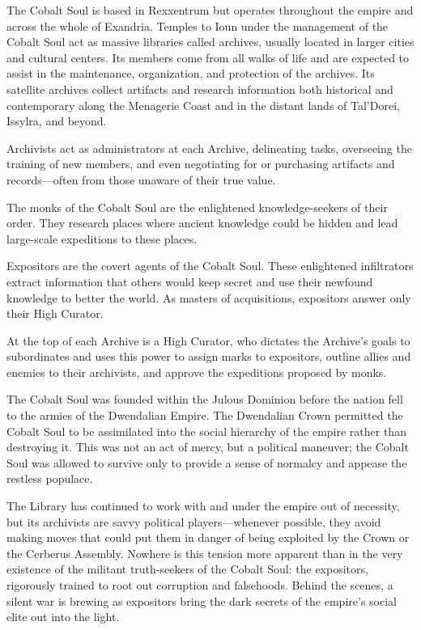 \documentclass[10pt,a4paper,twoside,bg=print,twocolumn,openany,nodeprecatedcode]{dndbook}
\begin{document}
The Cobalt Soul is based in Rexxentrum but operates throughout the empire and across the whole of Exandria. Temples to Ioun under the management of the Cobalt Soul act as massive libraries called archives, usually located in larger cities and cultural centers. Its members come from all walks of life and are expected to assist in the maintenance, organization, and protection of the archives. Its satellite archives collect artifacts and research information both historical and contemporary along the Menagerie Coast and in the distant lands of Tal'Dorei, Issylra, and beyond.

Archivists act as administrators at each Archive, delineating tasks, overseeing the training of new members, and even negotiating for or purchasing artifacts and records—often from those unaware of their true value.

The monks of the Cobalt Soul are the enlightened knowledge-seekers of their order. They research places where ancient knowledge could be hidden and lead large-scale expeditions to these places.

Expositors are the covert agents of the Cobalt Soul. These enlightened infiltrators extract information that others would keep secret and use their newfound knowledge to better the world. As masters of acquisitions, expositors answer only their High Curator.

At the top of each Archive is a High Curator, who dictates the Archive's goals to subordinates and uses this power to assign marks to expositors, outline allies and enemies to their archivists, and approve the expeditions proposed by monks.

The Cobalt Soul was founded within the Julous Dominion before the nation fell to the armies of the Dwendalian Empire. The Dwendalian Crown permitted the Cobalt Soul to be assimilated into the social hierarchy of the empire rather than destroying it. This was not an act of mercy, but a political maneuver; the Cobalt Soul was allowed to survive only to provide a sense of normalcy and appease the restless populace.

The Library has continued to work with and under the empire out of necessity, but its archivists are savvy political players—whenever possible, they avoid making moves that could put them in danger of being exploited by the Crown or the Cerberus Assembly. Nowhere is this tension more apparent than in the very existence of the militant truth-seekers of the Cobalt Soul: the expositors, rigorously trained to root out corruption and falsehoods. Behind the scenes, a silent war is brewing as expositors bring the dark secrets of the empire's social elite out into the light.
\end{document}
